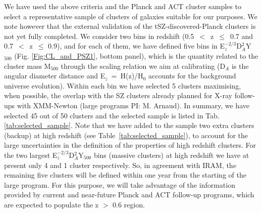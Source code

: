 \documentclass[11pt,a4paper,twoside,graphicx,color]{article}
\begin{document}
We have used the above criteria and the Planck and ACT cluster samples to select a representative sample of clusters of galaxies suitable for our purposes. 
We note however that the external validation of the tSZ-discovered-Planck clusters is not yet fully completed.
We consider two bins in redshift (0.5~$<$~z~$\le$~0.7 and 0.7~$<$~z~$\le$ 0.9),
and for each of them, we have defined 
five bins in E$_z^{-2/3}$D$_A^2$Y$_{500}$ (Fig. \ref{Fig:CL_and_PSZ1}, bottom panel), which is the 
quantity related to the cluster mass M$_{500}$ through the scaling relation we aim at calibrating (D$_A$ is the angular diameter 
distance and E$_z$~=~H(z)/H$_0$ accounts for the background universe evolution). Within each bin we have selected 5 clusters maximising, when possible, the 
overlap with the SZ  clusters already planned for X-ray follow-ups with XMM-Newton (large programs PI: M. Arnaud). 
In summary, we have selected 45 out of 50 clusters and the  selected sample is listed in Tab. \ref{tab:selected_sample}. 
Note that we have added to the sample 
two extra clusters (backup) at high redshift  (see Table~\ref{tab:selected_sample}), to account for 
the large uncertainties in the definition of the properties of high redshift clusters.
For the two largest  E$_z^{-2/3}$D$_A^2$Y$_{500}$ bins (massive clusters) at high redshift we have at 
present only 4 and 1 cluster respectively. So, in agreement with IRAM, the remaining five clusters will be defined within one year from the starting of the large program. 
For this purpose, we will take advantage of the information  provided by current and near-future Planck and 
ACT follow-up programs, which are expected to populate the z $>$ 0.6 region.\\ 
 

\end{document}
